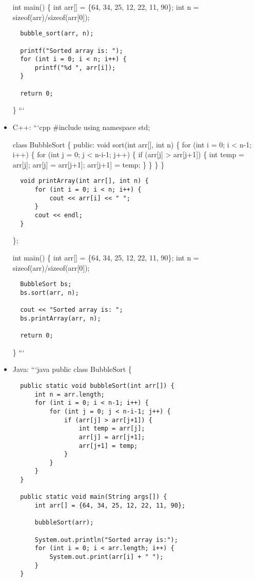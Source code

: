 \documentclass[
  letterpaper,
]{scrbook}
\begin{document}
\begin{itemize}
  int main() \{ int arr{[}{]} = \{64, 34, 25, 12, 22, 11, 90\}; int n =
  sizeof(arr)/sizeof(arr{[}0{]});

\begin{verbatim}
  bubble_sort(arr, n);

  printf("Sorted array is: ");
  for (int i = 0; i < n; i++) {
      printf("%d ", arr[i]);
  }

  return 0;
\end{verbatim}

  \} ```
\item
  C++: ```cpp \#include using namespace std;

  class BubbleSort \{ public: void sort(int arr{[}{]}, int n) \{ for
  (int i = 0; i \textless{} n-1; i++) \{ for (int j = 0; j \textless{}
  n-i-1; j++) \{ if (arr{[}j{]} \textgreater{} arr{[}j+1{]}) \{ int temp
  = arr{[}j{]}; arr{[}j{]} = arr{[}j+1{]}; arr{[}j+1{]} = temp; \} \} \}
  \}

\begin{verbatim}
  void printArray(int arr[], int n) {
      for (int i = 0; i < n; i++) {
          cout << arr[i] << " ";
      }
      cout << endl;
  }
\end{verbatim}

  \};

  int main() \{ int arr{[}{]} = \{64, 34, 25, 12, 22, 11, 90\}; int n =
  sizeof(arr)/sizeof(arr{[}0{]});

\begin{verbatim}
  BubbleSort bs;
  bs.sort(arr, n);

  cout << "Sorted array is: ";
  bs.printArray(arr, n);

  return 0;
\end{verbatim}

  \} ```
\item
  Java: ```java public class BubbleSort \{

\begin{verbatim}
  public static void bubbleSort(int arr[]) {
      int n = arr.length;
      for (int i = 0; i < n-1; i++) {
          for (int j = 0; j < n-i-1; j++) {
              if (arr[j] > arr[j+1]) {
                  int temp = arr[j];
                  arr[j] = arr[j+1];
                  arr[j+1] = temp;
              }
          }
      }
  }

  public static void main(String args[]) {
      int arr[] = {64, 34, 25, 12, 22, 11, 90};

      bubbleSort(arr);

      System.out.println("Sorted array is:");
      for (int i = 0; i < arr.length; i++) {
          System.out.print(arr[i] + " ");
      }
  }
\end{verbatim}


\end{itemize}
\end{document}
